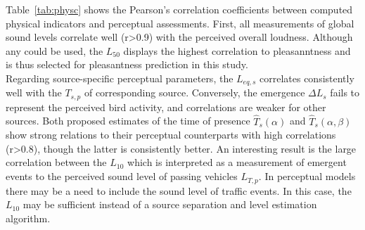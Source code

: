 \documentclass[11pt,a4paper]{article}
\begin{document}
Table~\ref{tab:physc} shows the Pearson's correlation coefficients between computed physical indicators and perceptual assessments. First, all measurements of global sound levels correlate well (r>0.9) with the perceived overall loudness. Although any could be used, the $L_{50}$ displays the highest correlation to pleasanntness and is thus selected for pleasantness prediction in this study.\\

Regarding source-specific perceptual parameters, the $L_{eq, s}$ correlates consistently well with the $T_{s, p}$ of corresponding source. Conversely, the emergence $\Delta L_s$ fails to represent the perceived bird activity, and correlations are weaker for other sources. Both proposed estimates of the time of presence $\hat T_s(\alpha)$ and $\hat T_s(\alpha, \beta)$ show strong relations to their perceptual counterparts with high correlations (r>0.8), though the latter is consistently better. An interesting result is the large correlation between the $L_{10}$ which is interpreted as a measurement of emergent events to the perceived sound level of passing vehicles $L_{T, p}$. In perceptual models there may be a need to include the sound level of traffic events. In this case, the $L_{10}$ may be sufficient instead of a source separation and level estimation algorithm.\\
\end{document}
